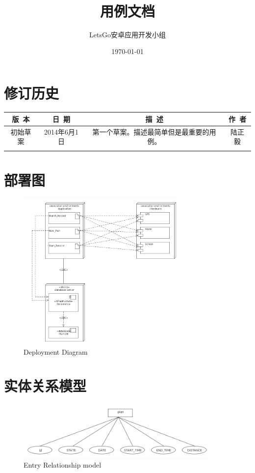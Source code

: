 \documentclass [a4paper,11pt]{article}
\title{用例文档}
\date{\today}
\author{LetsGo安卓应用开发小组}
\begin{document}
	
\maketitle
\section*{修订历史}

\begin{table}[!hbp]
\centering

\begin{tabular*}{\textwidth}{c|c|c|c}
\hline
\rule{0pt}{0.8cm}
版~本 & 日~期 & 描~述 & 作~者\\
\hline
\rule{0pt}{0.6cm}
初始草案 & 2014年6月1日 & 第一个草案。描述最简单但是最重要的用例。 & 陆正毅\\
\hline
\rule{0pt}{0.6cm}
 &  &  & \\
\hline
\end{tabular*}

\end{table}


\section*{部署图}

\begin{figure}[ht!]
			\centering
			\includegraphics[width=0.75\textwidth]{SD}
			\caption{Deployment Diagram}
			\label{mylabel1}
		\end{figure}
		
\section*{实体关系模型}

\begin{figure}[ht!]
			\centering
			\includegraphics[width=0.9\textwidth]{ER}
			\caption{Entry Relationship model}
			\label{mylabel1}
		\end{figure}

  
\end{document}
